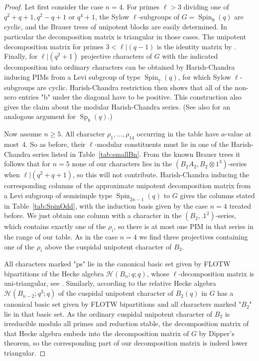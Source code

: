 \documentclass[12pt,leqno,a4paper]{amsart}
\newcommand{\cH}{{\mathcal{H}}}
\newcommand{\Spin}{{\operatorname{Spin}}}
\newcommand{\Sp}{{\operatorname{Sp}}}
\theoremstyle{remark}
\begin{document}
\begin{proof}
Let first consider the case $n=4$. For primes $\ell>3$ dividing one of $q^2+q+1,q^2-q+1$ or
$q^4+1$, the Sylow $\ell$-subgroups of $G=\Spin_9(q)$ are cyclic, and the
Brauer trees of unipotent blocks are easily determined. In particular the
decomposition matrix is triangular in those cases. The unipotent decomposition
matrix for primes $3<\ell|(q-1)$ is the identity matrix by
\cite[Thm.~23.12]{CE}. Finally, for $\ell|(q^2+1)$ projective
characters of $G$ with the indicated decomposition into ordinary characters
can be obtained by Harish-Chandra inducing PIMs from a Levi subgroup of type
$\Spin_7(q)$, for which Sylow $\ell$-subgroups are cyclic. Harish-Chandra
restriction then shows that all of the non-zero entries "b" under the diagonal
have to be positive. This construction also gives the claim about the modular
Harish-Chandra series. (See also \cite[Thm.~8.2]{DM15} for an analogous
argument for $\Sp_8(q)$.)
\par
Now assume $n\ge5$. All character $\rho_1,\ldots,\rho_{14}$ occurring in the
table have $a$-value at most~4. So as before, their $\ell$-modular constituents
must lie in one of the Harish-Chandra series listed in Table~\ref{tab:smallBn}.
From the known Brauer trees it follows that for $n=5$ none of our characters
lies in the $(B_2A_2,B_2\otimes 1^3)$-series when $\ell|(q^2+q+1)$, so this
will not contribute. Harish-Chandra inducing the corresponding columns of the
approximate unipotent decomposition matrix from a Levi subgroup of semisimple
type $\Spin_{2n-1}(q)$ to $G$ gives the columns stated in
Table~\ref{tab:SpinOdd}, with the induction basis given by the case $n=4$
treated before. We just obtain one column with a character in the
$(B_2,.1^2)$-series, which contains exactly one of the $\rho_i$, so there is
at most one PIM in that series in the range of our table. As in the case $n=4$
we find three projectives containing one of the $\rho_i$ above the cuspidal
unipotent character of $B_2$. \par
All characters marked "ps" lie in the canonical basic set given by FLOTW
bipartitions of the Hecke algebra $\cH(B_n;q;q)$, whose $\ell$-decomposition
matrix is uni-triangular, see \cite[Thm.~5.8.5]{GJ11}.
Similarly, according to \cite[Thm.~5.8.2]{GJ11} the relative Hecke algebra
$\cH(B_{n-2};q^3;q)$ of the cuspidal unipotent character of $B_2(q)$ in
$G$ has a canonical basic set given by FLOTW bipartitions and all characters
marked "$B_2$" lie in that basic set. As the ordinary cuspidal unipotent
character of $B_2$ is irreducible modulo all primes and reduction stable,
the decomposition matrix of that Hecke algebra embeds into the decomposition
matrix of $G$ by Dipper's theorem, so the corresponding part of our decomposition
matrix is indeed lower triangular.
\end{proof}
\end{document}
